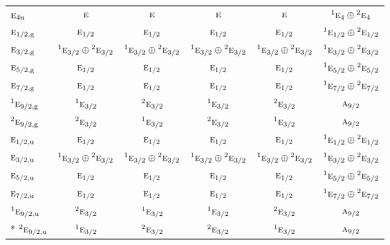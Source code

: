 \documentclass[10pt,a4paper]{article}
\numberwithin{equation}{section}
\newcommand{\irr}[1]{\text{\normalfont\scshape #1}}
\newcommand{\conjpair}[1]{{}^{#1}}
\newcommand{\ptag}[1]{\mathrm{#1}}
\begin{document}
{\begin{longtable}{@{}lccccc@{}}
$\irr{e}_{4\ptag{u}}$ & $\irr{e}$ & $\irr{e}$ & $\irr{e}$ & $\irr{e}$ & $\conjpair{1}\irr{e}_{4}\oplus \conjpair{2}\irr{e}_{4}$\\
$\irr{e}_{1/2,\ptag{g}}$ & $\irr{e}_{1/2}$ & $\irr{e}_{1/2}$ & $\irr{e}_{1/2}$ & $\irr{e}_{1/2}$ & $\conjpair{1}\irr{e}_{1/2}\oplus \conjpair{2}\irr{e}_{1/2}$\\
$\irr{e}_{3/2,\ptag{g}}$ & $\conjpair{1}\irr{e}_{3/2}\oplus \conjpair{2}\irr{e}_{3/2}$ & $\conjpair{1}\irr{e}_{3/2}\oplus \conjpair{2}\irr{e}_{3/2}$ & $\conjpair{1}\irr{e}_{3/2}\oplus \conjpair{2}\irr{e}_{3/2}$ & $\conjpair{1}\irr{e}_{3/2}\oplus \conjpair{2}\irr{e}_{3/2}$ & $\conjpair{1}\irr{e}_{3/2}\oplus \conjpair{2}\irr{e}_{3/2}$\\
$\irr{e}_{5/2,\ptag{g}}$ & $\irr{e}_{1/2}$ & $\irr{e}_{1/2}$ & $\irr{e}_{1/2}$ & $\irr{e}_{1/2}$ & $\conjpair{1}\irr{e}_{5/2}\oplus \conjpair{2}\irr{e}_{5/2}$\\
$\irr{e}_{7/2,\ptag{g}}$ & $\irr{e}_{1/2}$ & $\irr{e}_{1/2}$ & $\irr{e}_{1/2}$ & $\irr{e}_{1/2}$ & $\conjpair{1}\irr{e}_{7/2}\oplus \conjpair{2}\irr{e}_{7/2}$\\
$\conjpair{1}\irr{e}_{9/2,\ptag{g}}$ & $\conjpair{1}\irr{e}_{3/2}$ & $\conjpair{2}\irr{e}_{3/2}$ & $\conjpair{1}\irr{e}_{3/2}$ & $\conjpair{2}\irr{e}_{3/2}$ & $\irr{a}_{9/2}$\\
$\conjpair{2}\irr{e}_{9/2,\ptag{g}}$ & $\conjpair{2}\irr{e}_{3/2}$ & $\conjpair{1}\irr{e}_{3/2}$ & $\conjpair{2}\irr{e}_{3/2}$ & $\conjpair{1}\irr{e}_{3/2}$ & $\irr{a}_{9/2}$\\
$\irr{e}_{1/2,\ptag{u}}$ & $\irr{e}_{1/2}$ & $\irr{e}_{1/2}$ & $\irr{e}_{1/2}$ & $\irr{e}_{1/2}$ & $\conjpair{1}\irr{e}_{1/2}\oplus \conjpair{2}\irr{e}_{1/2}$\\
$\irr{e}_{3/2,\ptag{u}}$ & $\conjpair{1}\irr{e}_{3/2}\oplus \conjpair{2}\irr{e}_{3/2}$ & $\conjpair{1}\irr{e}_{3/2}\oplus \conjpair{2}\irr{e}_{3/2}$ & $\conjpair{1}\irr{e}_{3/2}\oplus \conjpair{2}\irr{e}_{3/2}$ & $\conjpair{1}\irr{e}_{3/2}\oplus \conjpair{2}\irr{e}_{3/2}$ & $\conjpair{1}\irr{e}_{3/2}\oplus \conjpair{2}\irr{e}_{3/2}$\\
$\irr{e}_{5/2,\ptag{u}}$ & $\irr{e}_{1/2}$ & $\irr{e}_{1/2}$ & $\irr{e}_{1/2}$ & $\irr{e}_{1/2}$ & $\conjpair{1}\irr{e}_{5/2}\oplus \conjpair{2}\irr{e}_{5/2}$\\
$\irr{e}_{7/2,\ptag{u}}$ & $\irr{e}_{1/2}$ & $\irr{e}_{1/2}$ & $\irr{e}_{1/2}$ & $\irr{e}_{1/2}$ & $\conjpair{1}\irr{e}_{7/2}\oplus \conjpair{2}\irr{e}_{7/2}$\\
$\conjpair{1}\irr{e}_{9/2,\ptag{u}}$ & $\conjpair{2}\irr{e}_{3/2}$ & $\conjpair{1}\irr{e}_{3/2}$ & $\conjpair{1}\irr{e}_{3/2}$ & $\conjpair{2}\irr{e}_{3/2}$ & $\irr{a}_{9/2}$\\*
$\conjpair{2}\irr{e}_{9/2,\ptag{u}}$ & $\conjpair{1}\irr{e}_{3/2}$ & $\conjpair{2}\irr{e}_{3/2}$ & $\conjpair{2}\irr{e}_{3/2}$ & $\conjpair{1}\irr{e}_{3/2}$ & $\irr{a}_{9/2}$\\
\bottomrule\end{longtable}}
\end{document}
